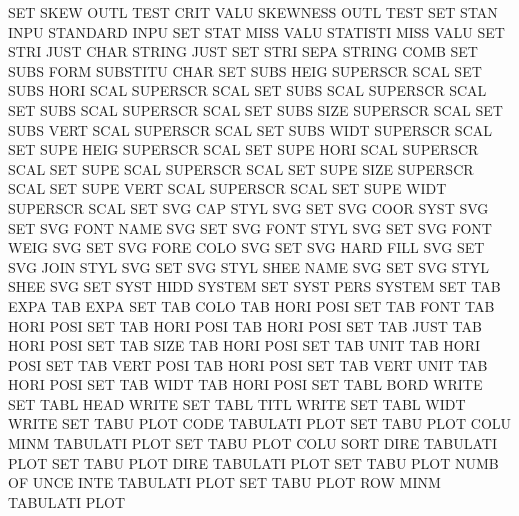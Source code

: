 SET      SKEW OUTL TEST CRIT VALU       SKEWNESS OUTL TEST
SET      STAN INPU                      STANDARD INPU
SET      STAT MISS VALU                 STATISTI MISS VALU
SET      STRI JUST CHAR                 STRING   JUST
SET      STRI SEPA                      STRING   COMB
SET      SUBS FORM                      SUBSTITU CHAR
SET      SUBS HEIG                      SUPERSCR SCAL
SET      SUBS HORI SCAL                 SUPERSCR SCAL
SET      SUBS SCAL                      SUPERSCR SCAL
SET      SUBS SCAL                      SUPERSCR SCAL
SET      SUBS SIZE                      SUPERSCR SCAL
SET      SUBS VERT SCAL                 SUPERSCR SCAL
SET      SUBS WIDT                      SUPERSCR SCAL
SET      SUPE HEIG                      SUPERSCR SCAL
SET      SUPE HORI SCAL                 SUPERSCR SCAL
SET      SUPE SCAL                      SUPERSCR SCAL
SET      SUPE SIZE                      SUPERSCR SCAL
SET      SUPE VERT SCAL                 SUPERSCR SCAL
SET      SUPE WIDT                      SUPERSCR SCAL
SET      SVG  CAP  STYL                 SVG
SET      SVG  COOR SYST                 SVG
SET      SVG  FONT NAME                 SVG
SET      SVG  FONT STYL                 SVG
SET      SVG  FONT WEIG                 SVG
SET      SVG  FORE COLO                 SVG
SET      SVG  HARD FILL                 SVG
SET      SVG  JOIN STYL                 SVG
SET      SVG  STYL SHEE NAME            SVG
SET      SVG  STYL SHEE                 SVG
SET      SYST HIDD                      SYSTEM
SET      SYST PERS                      SYSTEM
SET      TAB  EXPA                      TAB      EXPA
SET      TAB  COLO                      TAB HORI POSI
SET      TAB  FONT                      TAB HORI POSI
SET      TAB  HORI POSI                 TAB HORI POSI
SET      TAB  JUST                      TAB HORI POSI
SET      TAB  SIZE                      TAB HORI POSI
SET      TAB  UNIT                      TAB HORI POSI
SET      TAB  VERT POSI                 TAB HORI POSI
SET      TAB  VERT UNIT                 TAB HORI POSI
SET      TAB  WIDT                      TAB HORI POSI
SET      TABL BORD                      WRITE
SET      TABL HEAD                      WRITE
SET      TABL TITL                      WRITE
SET      TABL WIDT                      WRITE
SET      TABU PLOT CODE                 TABULATI PLOT
SET      TABU PLOT COLU MINM            TABULATI PLOT
SET      TABU PLOT COLU SORT DIRE       TABULATI PLOT
SET      TABU PLOT DIRE                 TABULATI PLOT
SET      TABU PLOT NUMB OF   UNCE INTE  TABULATI PLOT
SET      TABU PLOT ROW  MINM            TABULATI PLOT
